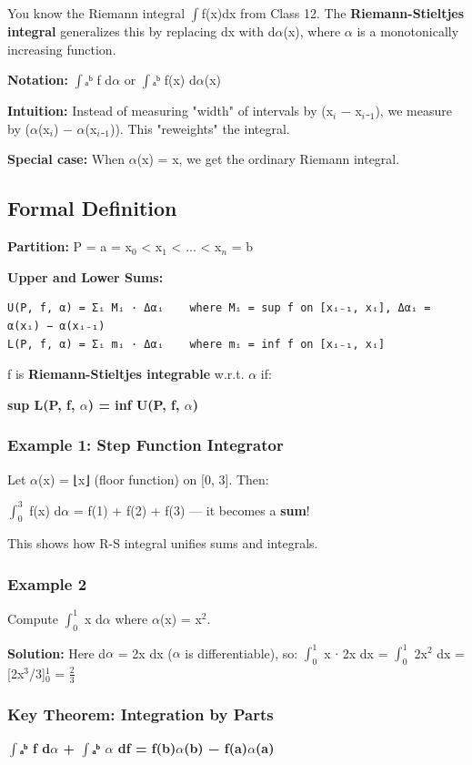 \documentclass[12pt,a4paper,openany]{book}
\begin{document}
{{You know the Riemann integral $\int$f(x)dx from Class 12. The \textbf{Riemann-Stieltjes integral} generalizes this by replacing dx with d$\alpha$(x), where $\alpha$ is a monotonically increasing function.

\textbf{Notation:} $\int$ₐᵇ f d$\alpha$ or $\int$ₐᵇ f(x) d$\alpha$(x)

\textbf{Intuition:} Instead of measuring "width" of intervals by (x$_i$ − x$_i$₋$_1$), we measure by ($\alpha$(x$_i$) − $\alpha$(x$_i$₋$_1$)). This "reweights" the integral.

\textbf{Special case:} When $\alpha$(x) = x, we get the ordinary Riemann integral.

\subsection{Formal Definition}

\textbf{Partition:} P = {a = x$_0$ < x$_1$ < ... < x$_n$ = b}

\textbf{Upper and Lower Sums:}
\begin{verbatim}
U(P, f, α) = Σᵢ Mᵢ · Δαᵢ    where Mᵢ = sup f on [xᵢ₋₁, xᵢ], Δαᵢ = α(xᵢ) − α(xᵢ₋₁)
L(P, f, α) = Σᵢ mᵢ · Δαᵢ    where mᵢ = inf f on [xᵢ₋₁, xᵢ]
\end{verbatim}

f is \textbf{Riemann-Stieltjes integrable} w.r.t. $\alpha$ if:

\textbf{sup L(P, f, $\alpha$) = inf U(P, f, $\alpha$)}

\subsubsection{Example 1: Step Function Integrator}
Let $\alpha$(x) = ⌊x⌋ (floor function) on [0, 3]. Then:

$\int_0^3$ f(x) d$\alpha$ = f(1) + f(2) + f(3) — it becomes a \textbf{sum}!

This shows how R-S integral unifies sums and integrals.

\subsubsection{Example 2}
Compute $\int_0^1$ x d$\alpha$ where $\alpha$(x) = x$^2$.

\textbf{Solution:} Here d$\alpha$ = 2x dx ($\alpha$ is differentiable), so:
$\int_0^1$ x $\cdot$ 2x dx = $\int_0^1$ 2x$^2$ dx = [2x$^3$/3]$_0^1$ = $\frac{2}{3}$

\subsubsection{ Key Theorem: Integration by Parts}
\textbf{$\int$ₐᵇ f d$\alpha$ + $\int$ₐᵇ $\alpha$ df = f(b)$\alpha$(b) − f(a)$\alpha$(a)}

}}
\end{document}
